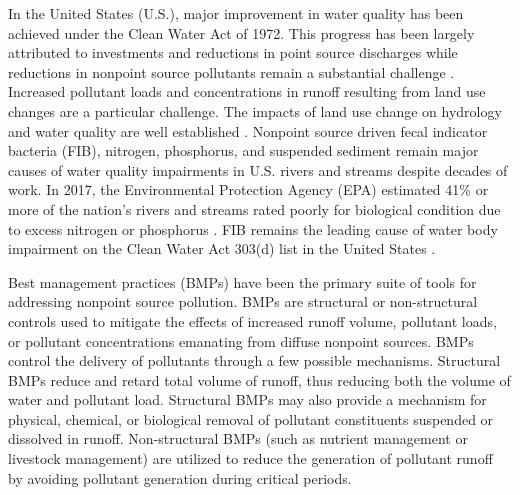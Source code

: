 \documentclass[utf8]{FrontiersinHarvard}
\begin{document}
In the United States (U.S.), major improvement in water quality has been achieved under the Clean Water Act of 1972.
This progress has been largely attributed to investments and reductions in point source discharges while reductions in nonpoint source pollutants remain a substantial challenge \citep{benhamLessonsLearnedTMDL2008, nationalresearchcouncilAssessingTMDLApproach2001, schrammTotalMaximumDaily2022}.
Increased pollutant loads and concentrations in runoff resulting from land use changes are a particular challenge.
The impacts of land use change on hydrology and water quality are well established \citep{allanLandscapesRiverscapesInfluence2004, carpenterNonpointPollutionSurface1998, bernhardtUnderstandingManagingMinimizing2008, careyEvaluatingNutrientImpacts2013, freemanImpactsUrbanizationDevelopment2019}.
Nonpoint source driven fecal indicator bacteria (FIB), nitrogen, phosphorus, and suspended sediment remain major causes of water quality impairments in U.S. rivers and streams despite decades of work.
In 2017, the Environmental Protection Agency (EPA) estimated 41\% or more of the nation's rivers and streams rated poorly for biological condition due to excess nitrogen or phosphorus \citep{epaNationalWaterQuality2017}.
FIB remains the leading cause of water body impairment on the Clean Water Act 303(d) list in the United States \citep{epaNationalWaterQuality2017}.

Best management practices (BMPs) have been the primary suite of tools for addressing nonpoint source pollution.
BMPs are structural or non-structural controls used to mitigate the effects of increased runoff volume, pollutant loads, or pollutant concentrations emanating from diffuse nonpoint sources.
BMPs control the delivery of pollutants through a few possible mechanisms.
Structural BMPs reduce and retard total volume of runoff, thus reducing both the volume of water and pollutant load.
Structural BMPs may also provide a mechanism for physical, chemical, or biological removal of pollutant constituents suspended or dissolved in runoff.
Non-structural BMPs (such as nutrient management or livestock management) are utilized to reduce the generation of pollutant runoff by avoiding pollutant generation during critical periods.
\end{document}
